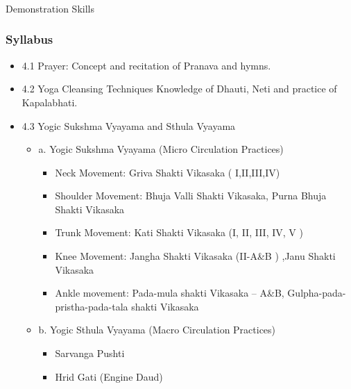 \begin{frame}[fragile]\frametitle{}
\begin{center}
{\Large Demonstration Skills}
\end{center}
\end{frame}

\begin{frame}[fragile]\frametitle{Syllabus}

\begin{itemize}
\item 4.1  Prayer: Concept and recitation of Pranava and hymns. 
\item 4.2  Yoga Cleansing Techniques Knowledge of Dhauti, Neti and practice of Kapalabhati. 
\item 4.3  Yogic Sukshma  Vyayama and Sthula Vyayama       
	\begin{itemize}
	\item a. Yogic Sukshma  Vyayama (Micro Circulation Practices) 
		\begin{itemize}
		\item Neck Movement: Griva Shakti Vikasaka ( I,II,III,IV) 
		\item Shoulder Movement: Bhuja Valli Shakti Vikasaka, Purna Bhuja Shakti Vikasaka  
		\item Trunk Movement: Kati Shakti Vikasaka (I, II, III, IV, V ) 
		\item Knee Movement: Jangha Shakti Vikasaka (II-A\&B ) ,Janu Shakti Vikasaka 
		\item Ankle movement: Pada-mula shakti Vikasaka – A\&B, Gulpha-pada-pristha-pada-tala shakti Vikasaka 
		\end{itemize}
	\item b. Yogic Sthula Vyayama (Macro Circulation Practices) 
		\begin{itemize}
		\item Sarvanga Pushti  
		\item Hrid Gati (Engine Daud) 
		\end{itemize}
	\end{itemize}
\end{itemize}
\end{frame}

